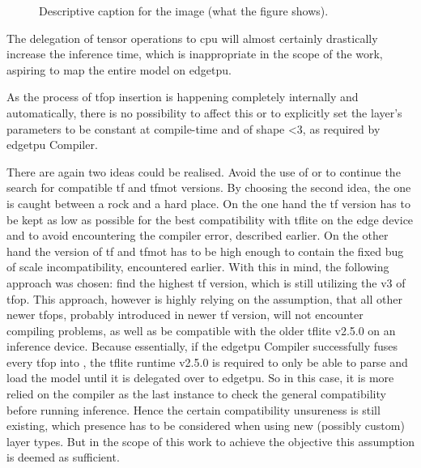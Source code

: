 {\begin{figure}[htbp]

  \caption{Descriptive caption for the image (what the figure shows).}
  \label{fig:compileSeqEdgeTPU}
\end{figure}

The delegation of tensor operations to \gls{cpu} will almost certainly drastically increase the inference time,
which is inappropriate in the scope of the work, aspiring to map the entire model on \gls{edgetpu}.

As the process of  \gls{tfop} insertion is happening completely internally and automatically,
there is no possibility to affect this or to explicitly set the layer's parameters to be constant at compile-time and of shape <3, as required by \gls{edgetpu} Compiler.

There are again two ideas could be realised. Avoid the use of  or to continue the search for compatible \gls{tf} and \gls{tfmot} versions.
By choosing the second idea, the one is caught between a rock and a hard place. On the one hand the \gls{tf} version has to be kept as low as possible for the best compatibility with
\gls{tflite} on the edge device and to avoid encountering the  compiler error, described earlier. On the other hand the version of \gls{tf} and \gls{tfmot}
has to be high enough to contain the fixed bug of scale incompatibility, encountered earlier. With this in mind, the following approach was chosen: find the highest \gls{tf} version,
which is still utilizing the v3 of  \gls{tfop}. This approach, however is highly relying on the assumption, that all other newer \glspl{tfop},
probably introduced in newer \gls{tf} version, will not encounter compiling problems, as well as be compatible with the older \gls{tflite} v2.5.0 on an inference device.
Because essentially, if the \gls{edgetpu} Compiler successfully fuses every \gls{tfop} into ,
the \gls{tflite} runtime v2.5.0 is required to only be able to parse and load the model until it is delegated over to \gls{edgetpu}.
So in this case, it is more relied on the compiler as the last instance to check the general compatibility before running inference.
Hence the certain compatibility unsureness is still existing, which presence has to be considered when using new (possibly custom) layer types.
But in the scope of this work to achieve the objective this assumption is deemed as sufficient.

}
